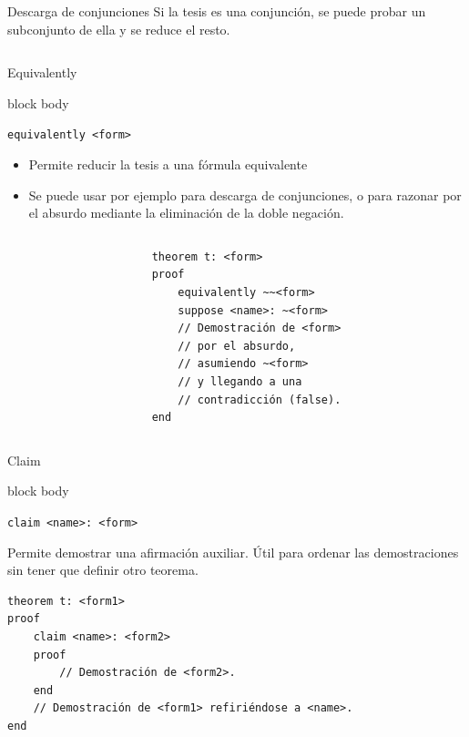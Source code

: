 \documentclass[xcolor={dvipsnames},spanish]{beamer}
\newenvironment{command}
    {
        \begin{beamercolorbox}[sep=8pt,center,shadow=true,rounded=true]{block body}
    }
    {\end{beamercolorbox}}
\begin{document}
\begin{frame}[fragile]{Descarga de conjunciones}
    Si la tesis es una conjunción, se puede probar un subconjunto de ella y se reduce el resto.

    \begin{columns}
        \begin{column}{0.5\textwidth}
            
        \end{column}
        \begin{column}{0.5\textwidth}
            
        \end{column}
    \end{columns}
\end{frame}

\begin{frame}[fragile]{Equivalently}
    \begin{command}
        \lstinline{equivalently <form>}
    \end{command}
    \begin{itemize}
        \item Permite reducir la tesis a una fórmula equivalente
        \item Se puede usar por ejemplo para descarga de conjunciones, o para razonar por el absurdo mediante la eliminación de la doble negación.
    \end{itemize}

    \begin{columns}
        \begin{column}{0.5\textwidth}
            
        \end{column}
        \begin{column}{0.5\textwidth}
\begin{lstlisting}[numbers=none,title=Razonamiento por el absurdo]
theorem t: <form>
proof
    equivalently ~~<form>
    suppose <name>: ~<form>
    // Demostración de <form>
    // por el absurdo,
    // asumiendo ~<form>
    // y llegando a una
    // contradicción (false).
end
\end{lstlisting}
        \end{column}
    \end{columns}
\end{frame}


\begin{frame}[fragile]{Claim}
    \begin{command}
        \lstinline{claim <name>: <form>}
    \end{command}
    Permite demostrar una afirmación auxiliar. Útil para ordenar las demostraciones sin tener que definir otro teorema.

    \begin{lstlisting}[numbers=none]
theorem t: <form1>
proof
    claim <name>: <form2>
    proof
        // Demostración de <form2>.
    end
    // Demostración de <form1> refiriéndose a <name>.
end
    \end{lstlisting}
\end{frame}
\end{document}
